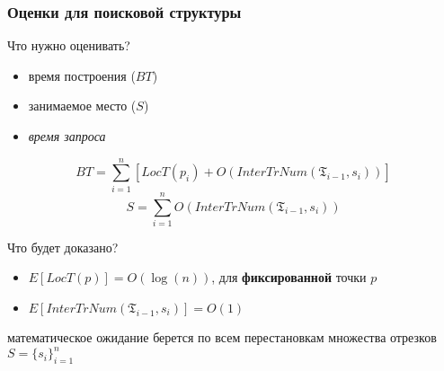 \documentclass{beamer}
\begin{document}
\begin{frame}
    \frametitle{Оценки для поисковой структуры}

    Что нужно оценивать?
    \begin{itemize}
        \pause
        \item{время построения ($BT$)}
        \pause
        \item{занимаемое место ($S$)}
        \pause
        \item{\textit{время запроса}}
    \end{itemize}

    \pause
    $$ BT = \sum_{i=1}^n \left[LocT(p_i) + O(InterTrNum(\mathfrak{T}_{i-1}, s_i)) \right]$$
    \pause
    $$ S = \sum_{i=1}^n O(InterTrNum(\mathfrak{T}_{i-1}, s_i))$$

    \pause
    Что будет доказано?

    \begin{itemize}
        \item{$E[LocT(p)] = O(\log(n))$, для \textbf{фиксированной} точки $p$}
        \item{$E[InterTrNum(\mathfrak{T}_{i-1}, s_i)] = O(1)$} 
    \end{itemize}
    математическое ожидание берется по всем перестановкам множества отрезков $S = \{s_i\}_{i=1}^n$

\end{frame}
\end{document}
